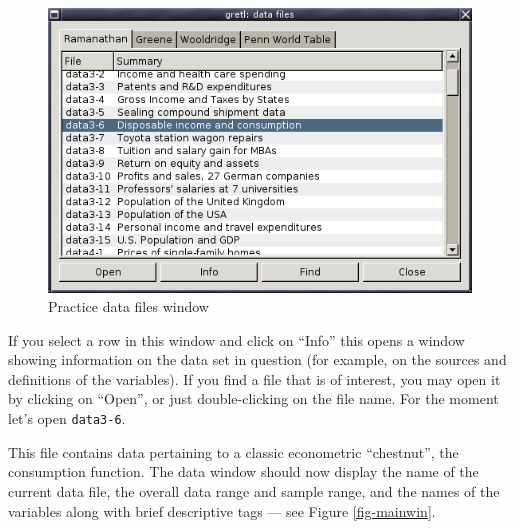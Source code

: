 \begin{figure}[htbp]
  \caption{Practice data files window}
  \label{fig-datafiles}
  \begin{center}
    \includegraphics[scale=0.5]{figures/datafiles}
  \end{center}
\end{figure}

If you select a row in this window and click on ``Info'' this opens a
window showing information on the data set in question (for example,
on the sources and definitions of the variables).  If you find a file
that is of interest, you may open it by clicking on ``Open'', or just
double-clicking on the file name. For the moment let's open
\verb+data3-6+.  


This file contains data pertaining to a classic
econometric ``chestnut'', the consumption function.  The data window
should now display the name of the current data file, the overall data
range and sample range, and the names of the variables along with
brief descriptive tags --- see Figure \ref{fig-mainwin}.
    
